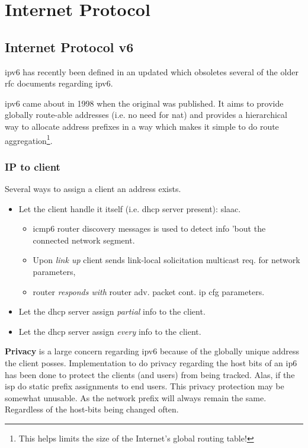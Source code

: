 \chapter[IP]{Internet Protocol}

\section[IPv6]{Internet Protocol v6}

\gls{ipv6} has recently been defined in an updated  which obsoletes several of the older \gls{rfc} documents regarding \gls{ipv6}.

\gls{ipv6} came about in 1998 when the original  was published. It aims to provide globally route-able addresses (i.e. no need for \gls{nat}) and provides a hierarchical way to allocate address prefixes in a way which makes it simple to do route aggregation\footnote{This helps limits the size of the Internet's global routing table!}.


\subsection{IP to client}

Several ways to assign a client an address exists.
\begin{itemize}
    \item Let the client handle it itself (i.e. \gls{dhcp} server present): \gls{slaac}.
    \begin{itemize}
        \item \gls{icmp6} router discovery messages is used to detect info 'bout the connected network segment.
        \item Upon \textit{link up} client sends link-local solicitation multicast req. for network parameters,
        \item router \textit{responds with}  router adv. packet cont. \gls{ip} cfg parameters.
    \end{itemize}
    \item Let the \gls{dhcp} server assign \textit{partial} info to the client.
    \item Let the \gls{dhcp} server assign \textit{every} info to the client.
\end{itemize}

\textbf{Privacy} is a large concern regarding \gls{ipv6} because of the globally unique address the client posses. Implementation to do privacy regarding the host bits of an \gls{ip6} has been done to protect the clients (and users) from being tracked. Alas, if the \gls{isp} do static prefix assignments to end users. This privacy protection may be somewhat unusable. As the network prefix will always remain the same. Regardless of the host-bits being changed often.

